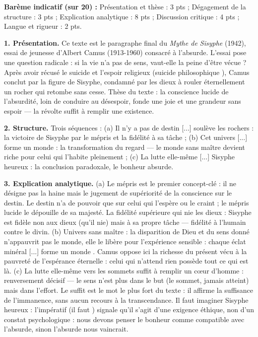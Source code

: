 \documentclass[11pt]{article}
\begin{document}
\begin{corrige}
\textbf{Barème indicatif (sur 20) :} Présentation et thèse : 3 pts ; Dégagement de la structure : 3 pts ; Explication analytique : 8 pts ; Discussion critique : 4 pts ; Langue et rigueur : 2 pts.

\textbf{1. Présentation.} Ce texte est le paragraphe final du \emph{Mythe de Sisyphe} (1942), essai de jeunesse d'Albert Camus (1913-1960) consacré à l'absurde. L'essai pose une question radicale : si la vie n'a pas de sens, vaut-elle la peine d'être vécue ? Après avoir récusé le suicide et l'espoir religieux (\guillemotleft suicide philosophique \guillemotright), Camus conclut par la figure de Sisyphe, condamné par les dieux à rouler éternellement un rocher qui retombe sans cesse. Thèse du texte : la conscience lucide de l'absurdité, loin de conduire au désespoir, fonde une joie et une grandeur sans espoir — la révolte suffit à remplir une existence.

\textbf{2. Structure.} Trois séquences : (a) \guillemotleft Il n'y a pas de destin [...] soulève les rochers \guillemotright : la victoire de Sisyphe par le mépris et la fidélité à sa tâche ; (b) \guillemotleft Cet univers [...] forme un monde \guillemotright : la transformation du regard — le monde sans maître devient riche pour celui qui l'habite pleinement ; (c) \guillemotleft La lutte elle-même [...] Sisyphe heureux \guillemotright : la conclusion paradoxale, le bonheur absurde.

\textbf{3. Explication analytique.} (a) Le \guillemotleft mépris \guillemotright est le premier concept-clé : il ne désigne pas la haine mais le jugement de supériorité de la conscience sur le destin. Le destin n'a de pouvoir que sur celui qui l'espère ou le craint ; le mépris lucide le dépouille de sa majesté. La \guillemotleft fidélité supérieure qui nie les dieux \guillemotright : Sisyphe est fidèle non aux dieux (qu'il nie) mais à sa propre tâche — fidélité à l'humain contre le divin. (b) \guillemotleft Univers sans maître \guillemotright : la disparition de Dieu et du sens donné n'appauvrit pas le monde, elle le libère pour l'expérience sensible : \guillemotleft chaque éclat minéral [...] forme un monde \guillemotright. Camus oppose ici la richesse du présent vécu à la pauvreté de l'espérance éternelle : celui qui n'attend rien possède tout ce qui est là. (c) \guillemotleft La lutte elle-même vers les sommets suffit à remplir un cœur d'homme \guillemotright : renversement décisif — le sens n'est plus dans le but (le sommet, jamais atteint) mais dans l'effort. Le \guillemotleft suffit \guillemotright est le mot le plus fort du texte : il affirme la suffisance de l'immanence, sans aucun recours à la transcendance. \guillemotleft Il faut imaginer Sisyphe heureux \guillemotright : l'impératif (\guillemotleft il faut \guillemotright) signale qu'il s'agit d'une exigence éthique, non d'un constat psychologique : nous devons penser le bonheur comme compatible avec l'absurde, sinon l'absurde nous vaincrait.


\end{corrige}
\end{document}
